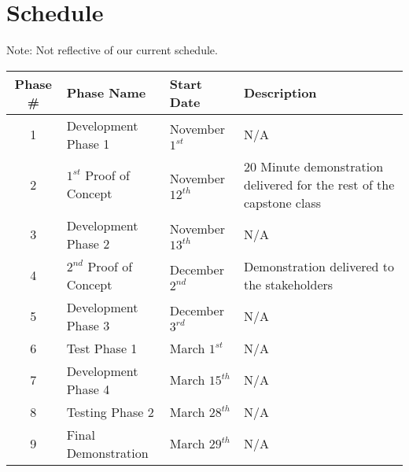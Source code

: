 \documentclass[paper=letter, fontsize=10pt]{scrartcl}
\numberwithin{equation}{section}		%
\numberwithin{figure}{section}			%
\numberwithin{table}{section}				%
\begin{document}
\section{Schedule}
Note: Not reflective of our current schedule.
\begin{center}
    \begin{tabular}{| c | l | l | p{5cm} |}
    \hline
    Phase \# & Phase Name & Start Date & Description \\ \hline
    1 & Development Phase 1 & November $1^{st}$ & N/A \\ \hline
    2 & $1^{st}$ Proof of Concept & November $12^{th}$ & 20 Minute demonstration delivered for the rest of the capstone class \\ \hline
    3 & Development Phase 2 & November $13^{th}$ & N/A \\ \hline
    4 & $2^{nd}$ Proof of Concept & December $2^{nd}$ & Demonstration delivered to the stakeholders \\ \hline
    5 & Development Phase 3 & December $3^{rd}$ & N/A \\ \hline
    6 & Test Phase 1 & March $1^{st}$ & N/A \\ \hline
    7 & Development Phase 4 & March $15^{th}$ & N/A \\ \hline
    8 & Testing Phase 2 & March $28^{th}$ & N/A \\ \hline
    9 & Final Demonstration & March $29^{th}$ & N/A \\ \hline
  	
    \end{tabular}
\end{center}


\end{document}

